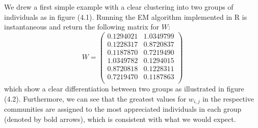 \documentclass[12pt]{ociamthesis}  %
\begin{document}
	We drew a first simple example with a clear clustering into two groups of individuals as in figure (4.1). Running the EM algorithm implemented in R is instantaneous and return the following matrix for $W$:
	\begin{equation}
	W = 
	\begin{pmatrix}
	0.1294021 & 1.0349799 \\
	0.1228317 & 0.8720837 \\
	0.1187870 & 0.7219490 \\
	1.0349782 & 0.1294015 \\
	0.8720818 & 0.1228311 \\
	0.7219470 & 0.1187863 \\
	\end{pmatrix}
	\end{equation} which show a clear differentiation between two groups as illustrated in figure (4.2). Furthermore, we can see that the greatest values for $w_{i,j}$ in the respective communities are assigned to the most appreciated individuals in each group (denoted by bold arrows), which is consistent with what we would expect.
	
\end{document}
